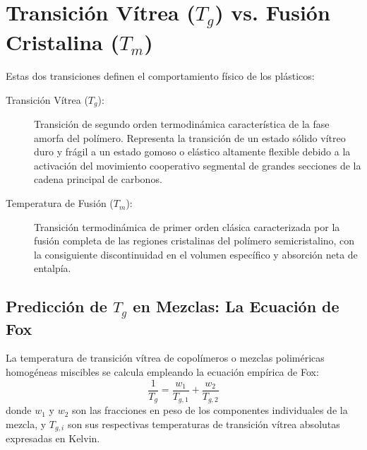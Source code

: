 \section{Transición Vítrea ($T_g$) vs. Fusión Cristalina ($T_m$)}

Estas dos transiciones definen el comportamiento físico de los plásticos:

\begin{description}
    \item[Transición Vítrea ($T_g$):] Transición de segundo orden termodinámica característica de la fase amorfa del polímero. Representa la transición de un estado sólido vítreo duro y frágil a un estado gomoso o elástico altamente flexible debido a la activación del movimiento cooperativo segmental de grandes secciones de la cadena principal de carbonos.
    \item[Temperatura de Fusión ($T_m$):] Transición termodinámica de primer orden clásica caracterizada por la fusión completa de las regiones cristalinas del polímero semicristalino, con la consiguiente discontinuidad en el volumen específico y absorción neta de entalpía.
\end{description}

\subsection{Predicción de $T_g$ en Mezclas: La Ecuación de Fox}
La temperatura de transición vítrea de copolímeros o mezclas poliméricas homogéneas miscibles se calcula empleando la ecuación empírica de Fox:
\begin{equation}
    \frac{1}{T_g} = \frac{w_1}{T_{g,1}} + \frac{w_2}{T_{g,2}}
    \label{eq:fox}
\end{equation}
donde $w_1$ y $w_2$ son las fracciones en peso de los componentes individuales de la mezcla, y $T_{g,i}$ son sus respectivas temperaturas de transición vítrea absolutas expresadas en Kelvin.
